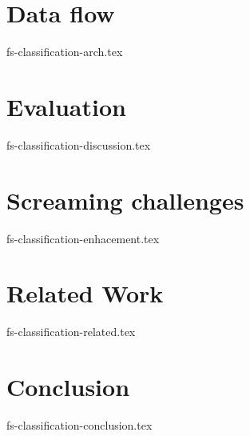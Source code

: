 \documentclass[sigconf]{acmart}
\theoremstyle{remark}
\begin{document}
\section {Data flow}
 {fs-classification-arch.tex}

\section {Evaluation}
 {fs-classification-discussion.tex}

\section {Screaming challenges}
 {fs-classification-enhacement.tex}

\section{Related Work}
 {fs-classification-related.tex}

\section {Conclusion}
 {fs-classification-conclusion.tex}



\end{document}
